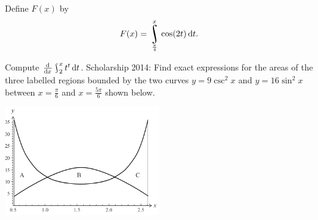 \begin{questions}
  \questioM Define $ F(x) $ by
            \begin{displaymath}
              F(x) = \rint^x_{\frac{\pi}{4}} \cos(2t) \dif{t}.
            \end{displaymath}
  \questioM Compute $ \od{}{x} \rint^{x}_{2} t^t \dif{t} $.
  \questioS Scholarship 2014: Find exact expressions for the areas of the three labelled regions bounded by the two curves $ y = 9\csc^2 x $
            and $ y = 16\sin^2 x $ between $ x = \frac{\pi}{6} $ and $ x = \frac{5\pi}{6} $ shown below.
            \begin{center}
              \includegraphics[width=0.5\textwidth]{schol14}
            \end{center}
\end{questions}

